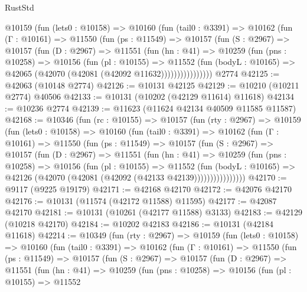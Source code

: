 \begin{lexlean}{RustStd}
\begin{coremodule}
        @10159
          (fun (lets0 : @10158) =>
          @10160
            (fun (tail0 : @3391) =>
            @10162
              (fun (Γ : @10161) =>
              @11550
                (fun (ps : @11549) =>
                @10157
                  (fun (S : @2967) =>
                  @10157
                    (fun (D : @2967) =>
                    @11551
                      (fun (hn : @41) =>
                      @10259
                        (fun (pns : @10258) =>
                        @10156
                          (fun (pl : @10155) =>
                          @11552
                            (fun (bodyL : @10165) =>
                            @42065 (@42070 (@42081 (@42092 @11632))))))))))))))))
    @2774
@42125 := @42063 (@10148 @2774)
@42126 := @10131 @42125
@42129 := @10210 (@10211 @2774) @40506
@42133 := @10131 (@10202 (@42129 @11614) @11618)
@42134 := @10236 @2774
@42139 := @11623 (@11624 @42134 @40509 @11585 @11587)
@42168 := @10346
    (fun (rc : @10155) =>
    @10157
      (fun (rty : @2967) =>
      @10159
        (fun (lets0 : @10158) =>
        @10160
          (fun (tail0 : @3391) =>
          @10162
            (fun (Γ : @10161) =>
            @11550
              (fun (ps : @11549) =>
              @10157
                (fun (S : @2967) =>
                @10157
                  (fun (D : @2967) =>
                  @11551
                    (fun (hn : @41) =>
                    @10259
                      (fun (pns : @10258) =>
                      @10156
                        (fun (pl : @10155) =>
                        @11552
                          (fun (bodyL : @10165) =>
                          @42126 (@42070 (@42081 (@42092 (@42133 @42139))))))))))))))))
@42170 := @9117 (@9225 @19179)
@42171 := @42168 @42170
@42172 := @42076 @42170
@42176 := @10131 (@11574 (@42172 @11588) @11595)
@42177 := @42087 @42170
@42181 := @10131 (@10261 (@42177 @11588) @3133)
@42183 := @42129 (@10218 @42170)
@42184 := @10202 @42183
@42186 := @10131 (@42184 @11618)
@42214 := @10349
    (fun (rty : @2967) =>
    @10159
      (fun (lets0 : @10158) =>
      @10160
        (fun (tail0 : @3391) =>
        @10162
          (fun (Γ : @10161) =>
          @11550
            (fun (ps : @11549) =>
            @10157
              (fun (S : @2967) =>
              @10157
                (fun (D : @2967) =>
                @11551
                  (fun (hn : @41) =>
                  @10259
                    (fun (pns : @10258) =>
                    @10156
                      (fun (pl : @10155) =>
                      @11552

\end{coremodule}
\end{lexlean}
